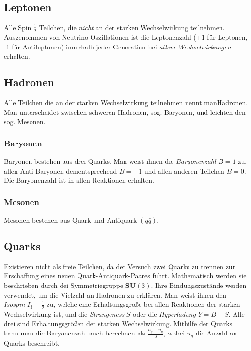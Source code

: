 \documentclass[final]{summery_5.0}
\begin{document}
\subsection{Leptonen}
Alle Spin $\frac12$ Teilchen, die \emph{nicht} an der starken Wechselwirkung teilnehmen. Ausgenommen von Neutrino-Oszillationen ist die Leptonenzahl (+1 für Leptonen, -1 für Antileptonen) innerhalb jeder Generation bei \emph{allem Wechselwirkungen} erhalten.

\subsection{Hadronen}
Alle Teilchen die an der starken Wechselwirkung teilnehmen nennt manHadronen. Man unterscheidet zwischen schweren Hadronen, sog. Baryonen, und leichten den sog. Mesonen.

\subsubsection{Baryonen}
 Baryonen bestehen aus drei Quarks. Man weist ihnen die \emph{Baryonenzahl} $B=1$ zu, allen Anti-Baryonen dementsprechend $B=-1$ und allen anderen Teilchen $B=0$. Die Baryonenzahl ist in allen Reaktionen erhalten.

 \subsubsection{Mesonen}
 Mesonen bestehen aus Quark und Antiquark $(q\bar q)$. 

\subsection{Quarks}
Existieren nicht als freie Teilchen, da der Versuch zwei Quarks zu trennen zur Erschaffung eines neuen Quark-Antiquark-Paares führt. 
Mathematisch werden sie beschrieben durch dei Symmetriegruppe $\mathbf{SU}(3)$.
Ihre Bindungszustände werden verwendet, um die Vielzahl an Hadronen zu erklären. Man weist ihnen den \emph{Isospin} $I_3 \pm \frac12$ zu, welche eine Erhaltungsgröße bei allen Reaktionen der starken Wechselwirkung ist, und die \emph{Strangeness} $S$ oder die \emph{Hyperladung} $Y=B+S$. Alle drei sind Erhaltungsgrößen der starken Wechselwirkung.
Mithilfe der Quarks kann man die Baryonenzahl auch berechnen als $\frac{n_q - n_{\bar q}}{3}$, wobei $n_q$ die Anzahl an Quarks beschreibt. 
\end{document}
